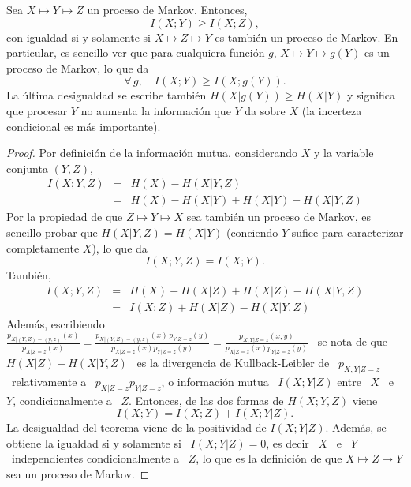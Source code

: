 \begin{teorema}
  Sea  $X \mapsto  Y \mapsto  Z$ un  proceso de  Markov. Entonces,
  \[
  I(X;Y) \ge I(X;Z),
  \]
  con igualdad si y solamente si $X \mapsto Z \mapsto Y$ es tambi\'en un proceso
  de Markov. En  particular, es sencillo ver que  para cualquiera funci\'on $g$,
  $X \mapsto Y \mapsto g(Y)$ es un proceso de Markov, lo que da
  \[
  \forall \, g, \quad I(X;Y) \ge I(X;g(Y)).
  \]
  La  \'ultima  desigualdad  se  escribe  tambi\'en  $H(X|g(Y))  \ge  H(X|Y)$  y
  significa que  procesar $Y$ no aumenta  la informaci\'on que $Y$  da sobre $X$
  (la incerteza condicional es m\'as importante).
\end{teorema}
%
\begin{proof}
  Por definici\'on  de la  informaci\'on mutua, considerando  $X$ y  la variable
  conjunta $(Y,Z)$,
  \begin{eqnarray*}
  I(X ; Y,Z) & = & H(X) - H(X|Y,Z)\\[2.5mm]
  & = & H(X) - H(X|Y) + H(X|Y) - H(X|Y,Z)
  \end{eqnarray*}
  \noindent Por  la propiedad de  que $Z \mapsto  Y \mapsto X$ sea  tambi\'en un
  proceso de Markov,  es sencillo probar que $H(X|Y,Z)  = H(X|Y)$ (conciendo $Y$
  sufice para caracterizar completamente $X$), lo que da
  \[
  I(X;Y,Z) = I(X;Y).
  \]
  Tambi\'en,
  \begin{eqnarray*}
  I(X ; Y,Z) & = & H(X) - H(X|Z) + H(X|Z) - H(X|Y,Z)\\[2.5mm]
  & = & I(X;Z) + H(X|Z) - H(X|Y,Z)
  \end{eqnarray*}
  \noindent Adem\'as, escribiendo \ $\frac{p_{X|(Y,Z)=(y,z)}(x)}{p_{X|Z=z}(x)} =
  \frac{p_{X|(Y,Z)=(y,z)}(x)   \,  p_{Y|Z=z}(y)}{p_{X|Z=z}(x)   p_{Y|Z=z}(y)}  =
  \frac{p_{X,Y|Z=z}(x,y)}{p_{X|Z=z}(x) p_{Y|Z=z}(y)}$ \ se nota de que \ $H(X|Z)
  -  H(X|Y,Z)$ \  es la  divergencia de  Kullback-Leibler de  \  $p_{X,Y|Z=z}$ \
  relativamente a  \ $p_{X|Z=z} p_{Y|Z=z}$,  o informaci\'on mutua  \ $I(X;Y|Z)$
  entre \ $X$ \ e \ $Y$,  condicionalmente a \ $Z$.  Entonces, de las dos formas
  de $H(X;Y,Z)$ viene
  \[
  I(X;Y) = I(X;Z) + I(X;Y|Z).
  \]
  La desigualdad del teorema viene de la positividad de $I(X;Y|Z)$. Adem\'as, se
  obtiene la igualdad si  y solamente si \ $I(X;Y|Z) = 0$, es decir  \ $X$ \ e \
  $Y$ \  independientes condicionalmente a \  $Z$, lo que es  la definici\'on de
  que $X \mapsto Z \mapsto Y$ sea un proceso de Markov.
\end{proof}

